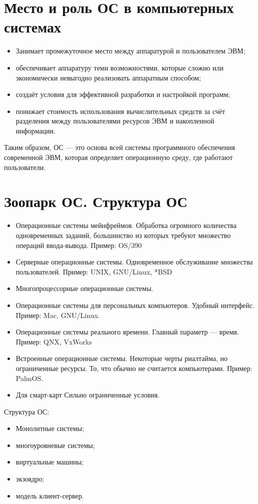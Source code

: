 \documentclass[a4paper, 10pt, notitlepage, pdftex,headsepline]{scrartcl}
\begin{document}
\section{Место и роль ОС в компьютерных системах}
  \begin{itemize}
    \item Занимает промежуточное место между аппаратурой и пользователем
      ЭВМ;
    \item обеспечивает аппаратуру теми возможностями, которые сложно или
      экономически невыгодно реализовать аппаратным способом;
    \item создаёт условия для эффективной разработки и настройкой
      программ;
    \item понижает стоимость использования вычислительных средств за
      счёт разделения между пользователями ресурсов ЭВМ и накопленной
      информации.
  \end{itemize}

  Таким образом, ОС --- это основа всей системы программного обеспечения
  современной ЭВМ, которая определяет операционную среду, где работают
  пользователи.
\section{Зоопарк ОС. Структура ОС}
  \begin{itemize}
    \item Операционные системы мейнфреймов.
      Обработка огромного количества одновременных заданий, большинство из
      которых требуют множество операций ввода-вывода.
      Пример: OS/390
    \item Серверные операционные системы.
      Одновременное обслуживание множества пользователей.
      Пример: UNIX, GNU/Linux, *BSD
    \item Многопроцессорные операционные системы.
    \item Операционные системы для персональных компьютеров.
      Удобный интерфейс.
      Пример: Mac, GNU/Linux.
    \item Операционные системы реального времени.
      Главный параметр --- время.
      Пример: QNX, VxWorks
    \item Встроенные операционные системы.
      Некоторые черты риалтайма, но ограниченные ресурсы.
      То, что обычно не считается компьютерами.
      Пример: PalmOS.
    \item Для смарт-карт
      Сильно ограниченные условия.
  \end{itemize}
  Структура ОС:
  \begin{itemize}
    \item Монолитные системы;
    \item многоуровневые системы;
    \item виртуальные машины;
    \item экзоядро;
    \item модель клиент-сервер.
  \end{itemize}
\end{document}
